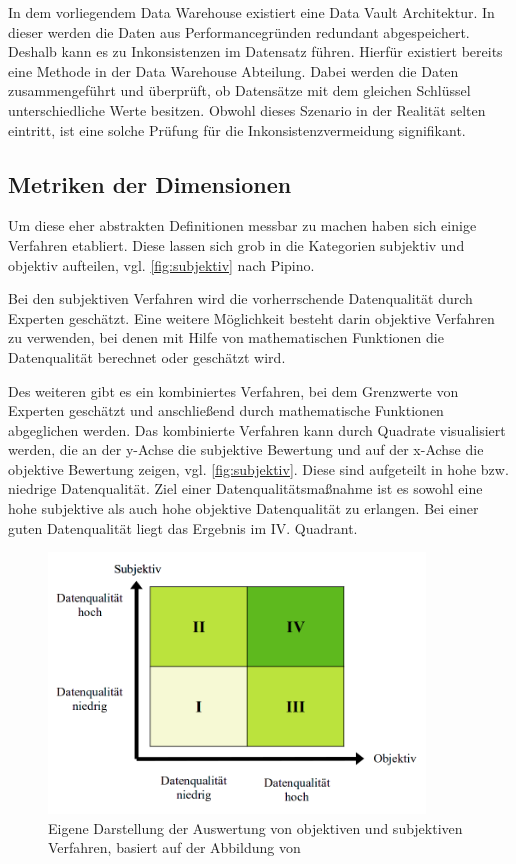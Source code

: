 In dem vorliegendem Data Warehouse existiert eine Data Vault Architektur. 
In dieser werden die Daten aus Performancegründen redundant abgespeichert. 
Deshalb kann es zu Inkonsistenzen im Datensatz führen. \cite{bolt2020}
Hierfür existiert bereits eine Methode in der Data Warehouse Abteilung.
Dabei werden die Daten zusammengeführt und überprüft, ob Datensätze mit dem gleichen Schlüssel unterschiedliche Werte besitzen. 
Obwohl dieses Szenario in der Realität selten eintritt, ist eine solche Prüfung für die Inkonsistenzvermeidung signifikant. 

\subsection{Metriken der Dimensionen}
Um diese eher abstrakten Definitionen messbar zu machen haben sich einige Verfahren etabliert.
Diese lassen sich grob in die Kategorien subjektiv und objektiv aufteilen, vgl. \autoref{fig:subjektiv} nach Pipino. 


Bei den subjektiven Verfahren wird die vorherrschende Datenqualität durch Experten geschätzt. 
Eine weitere Möglichkeit besteht darin objektive Verfahren zu verwenden, bei denen mit Hilfe von mathematischen Funktionen die Datenqualität berechnet oder geschätzt wird. 

Des weiteren gibt es ein kombiniertes Verfahren, bei dem Grenzwerte von Experten geschätzt und anschließend durch mathematische Funktionen abgeglichen werden. 
Das kombinierte Verfahren kann durch Quadrate visualisiert werden, die an der y-Achse die subjektive Bewertung und auf der x-Achse die objektive Bewertung zeigen, vgl. \autoref{fig:subjektiv}. 
Diese sind aufgeteilt in hohe bzw. niedrige Datenqualität.
Ziel einer Datenqualitätsmaßnahme ist es sowohl eine hohe subjektive als auch hohe objektive Datenqualität zu erlangen.
Bei einer guten Datenqualität liegt das Ergebnis im IV. Quadrant. \cite{pipino2002} 


\begin{figure}[hbt!]
\centering
\includegraphics[width=100mm,scale=1]{content/subjektiv_objektiv.png}
\caption{Eigene Darstellung der Auswertung von objektiven und subjektiven Verfahren, basiert auf der Abbildung von \cite{pipino2002}}\label{fig:subjektiv}
\end{figure}




